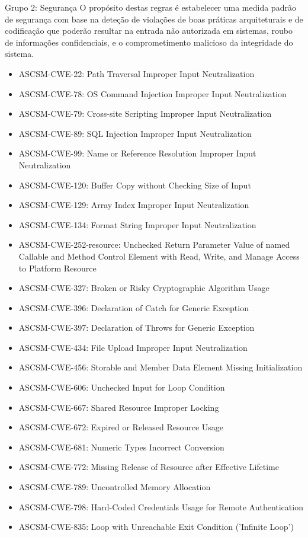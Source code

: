 \documentclass[openany,10pt,a4paper]{article}
\begin{document}
\begin{appendix}
Grupo 2: Segurança
O propósito destas regras é estabelecer uma medida padrão de segurança com base na deteção de violações de boas práticas arquiteturais e de codificação que poderão resultar na entrada não autorizada em sistemas, roubo de informações confidenciais, e o comprometimento malicioso da integridade do sistema.
\begin{itemize}
	\setlength\itemsep{0em}
	\item ASCSM-CWE-22: Path Traversal Improper Input Neutralization
	\item ASCSM-CWE-78: OS Command Injection Improper Input Neutralization
	\item ASCSM-CWE-79: Cross-site Scripting Improper Input Neutralization
	\item ASCSM-CWE-89: SQL Injection Improper Input Neutralization
	\item ASCSM-CWE-99: Name or Reference Resolution Improper Input Neutralization
	\item ASCSM-CWE-120: Buffer Copy without Checking Size of Input
	\item ASCSM-CWE-129: Array Index Improper Input Neutralization
	\item ASCSM-CWE-134: Format String Improper Input Neutralization
	\item ASCSM-CWE-252-resource: Unchecked Return Parameter Value of named Callable and Method Control Element with Read, Write, and Manage Access to Platform Resource
	\item ASCSM-CWE-327: Broken or Risky Cryptographic Algorithm Usage
	\item ASCSM-CWE-396: Declaration of Catch for Generic Exception
	\item ASCSM-CWE-397: Declaration of Throws for Generic Exception
	\item ASCSM-CWE-434: File Upload Improper Input Neutralization
	\item ASCSM-CWE-456: Storable and Member Data Element Missing Initialization
	\item ASCSM-CWE-606: Unchecked Input for Loop Condition
	\item ASCSM-CWE-667: Shared Resource Improper Locking
	\item ASCSM-CWE-672: Expired or Released Resource Usage
	\item ASCSM-CWE-681: Numeric Types Incorrect Conversion
	\item ASCSM-CWE-772: Missing Release of Resource after Effective Lifetime
	\item ASCSM-CWE-789: Uncontrolled Memory Allocation
	\item ASCSM-CWE-798: Hard-Coded Credentials Usage for Remote Authentication
	\item ASCSM-CWE-835: Loop with Unreachable Exit Condition ('Infinite Loop')
\end{itemize} 


\end{appendix}
\end{document}
